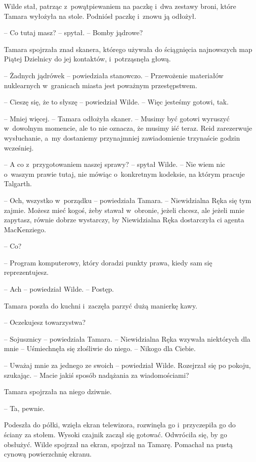 \documentclass[oneside,polish,11pt,sfheadings]{mwbk}
\begin{document}
Wilde stał, patrząc z~powątpiewaniem na paczkę i~dwa zestawy broni,
które Tamara wyłożyła na stole. Podniósł paczkę i~znowu ją odłożył.

-- Co tutaj masz? -- spytał. -- Bomby jądrowe?

Tamara spojrzała znad skanera, którego używała do ściągnięcia
najnowszych map Piątej Dzielnicy do jej kontaktów, i~potrząsnęła głową.

-- Żadnych jądrówek -- powiedziała stanowczo. -- Przewożenie materiałów
nuklearnych w~granicach miasta jest poważnym przestępstwem.

-- Cieszę się, że to słyszę -- powiedział Wilde. -- Więc jesteśmy gotowi,
tak.

-- Mniej więcej. -- Tamara odłożyła skaner. -- Musimy być gotowi wyruszyć w~dowolnym momencie, ale to nie oznacza, że musimy iść teraz. Reid
zarezerwuje wysłuchanie, a~my dostaniemy przynajmniej zawiadomienie
trzynaście godzin wcześniej.

-- A co z~przygotowaniem naszej sprawy? -- spytał Wilde. -- Nie wiem nic o~waszym prawie tutaj, nie mówiąc o~konkretnym kodeksie, na którym pracuje
Talgarth.

-- Och, wszystko w~porządku -- powiedziała Tamara. -- Niewidzialna Ręka się
tym zajmie. Możesz mieć kogoś, żeby stawał w~obronie, jeżeli chcesz,
ale jeżeli mnie zapytasz, równie dobrze wystarczy, by Niewidzialna Ręka
dostarczyła ci agenta MacKenziego.

-- Co?

-- Program komputerowy, który doradzi punkty prawa, kiedy sam się
reprezentujesz.

-- Ach -- powiedział Wilde. -- Postęp.

Tamara poszła do kuchni i~zaczęła parzyć dużą manierkę kawy.

-- Oczekujesz towarzystwa?

-- Sojusznicy -- powiedziała Tamara. -- Niewidzialna Ręka wzywała
niektórych dla mnie -- Uśmiechnęła się złośliwie do niego. -- Nikogo dla
Ciebie.

-- Uważaj mnie za jednego ze swoich -- powiedział Wilde. Rozejrzał się po
pokoju, szukając. -- Macie jakiś sposób nadążania za wiadomościami?

Tamara spojrzała na niego dziwnie. 

-- Ta, pewnie.

Podeszła do półki, wzięła ekran telewizora, rozwinęła go i~przyczepiła
go do ściany za stołem. Wysoki czajnik zaczął się gotować. Odwróciła
się, by go obsłużyć. Wilde spojrzał na ekran, spojrzał na Tamarę.
Pomachał na pustą cynową powierzchnię ekranu.
\end{document}
